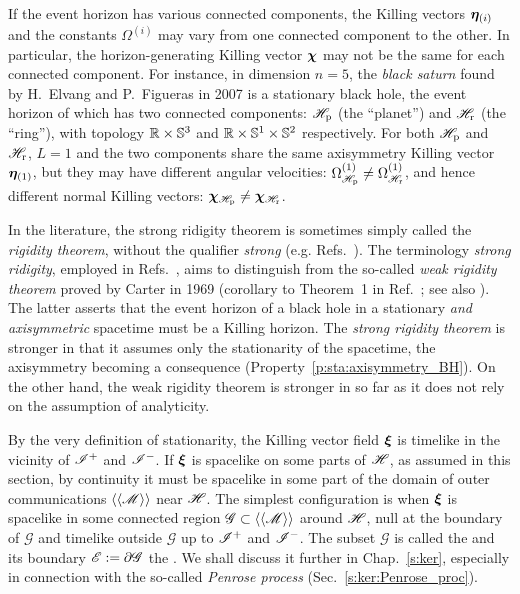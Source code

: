 \begin{remark}
\label{r:sta:dep_eta_Omega}
If the event horizon has various connected components, the Killing vectors
$\bm{\eta}_{(i)}$ and the constants $\Omega^{(i)}$ may vary from one connected
component to the other. In particular, the horizon-generating Killing vector $\bm{\chi}$
may not be the same for each connected component. For instance,
in dimension $n=5$, the \emph{black saturn}
found by H.~Elvang and P.~Figueras in 2007 \cite{ElvanF07}
is a stationary black hole, the event horizon of which has two connected
components: $\mathscr{H}_{\rm p}$ (the ``planet'') and $\mathscr{H}_{\rm r}$ (the ``ring''),
with topology $\mathbb{R}\times\mathbb{S}^3$ and $\mathbb{R}\times\mathbb{S}^1\times\mathbb{S}^2$ respectively.
For both $\mathscr{H}_{\rm p}$ and $\mathscr{H}_{\rm r}$, $L=1$ and
the two components share the same axisymmetry Killing vector $\bm{\eta}_{(1)}$,
but they may have different angular velocities:
$\Omega^{(1)}_{\mathscr{H}_{\rm p}} \neq \Omega^{(1)}_{\mathscr{H}_{\rm r}}$, and hence
different normal Killing vectors: $\bm{\chi}_{\mathscr{H}_{\rm p}} \neq \bm{\chi}_{\mathscr{H}_{\rm r}}$.
\end{remark}

In the literature, the strong ridigity theorem is sometimes simply called
the \emph{rigidity theorem}, without the qualifier \emph{strong}
(e.g. Refs.~\cite{Choqu09,HollaI12}).
The terminology \emph{strong ridigity}, employed in Refs.~\cite{Carte99,ChrusLH12,Heusl96},
aims to distinguish from the so-called
\emph{weak rigidity theorem}
proved by Carter in 1969 (corollary to Theorem~1 in Ref.~\cite{Carte69}; see also \cite{Carte72}). The latter asserts that the event horizon of a black hole in a stationary \emph{and axisymmetric}
spacetime must be a Killing horizon. The \emph{strong rigidity theorem} is
stronger in that it assumes only the stationarity of the spacetime, the axisymmetry
becoming a consequence (Property~\ref{p:sta:axisymmetry_BH}). On the other hand,
the weak rigidity theorem is stronger in so far as it does not rely on the
assumption of analyticity.

By the very definition of stationarity, the Killing vector field $\bm{\xi}$ is
timelike in the vicinity of $\mathscr{I}^+$ and $\mathscr{I}^-$. If $\bm{\xi}$ is spacelike
on some parts of $\mathscr{H}$, as assumed in this section, by continuity it must be spacelike
in some part of the domain of outer communications $\langle\langle \mathscr{M}\rangle\rangle$
near $\mathscr{H}$. The simplest configuration is when
$\bm{\xi}$ is spacelike in some connected region $\mathscr{G}\subset \langle\langle \mathscr{M}\rangle\rangle$
around $\mathscr{H}$, null at the boundary of $\mathscr{G}$ and timelike outside $\mathscr{G}$
up to $\mathscr{I}^+$ and $\mathscr{I}^-$. The subset $\mathscr{G}$ is
called the  and its boundary $\mathscr{E}:=\partial\mathscr{G}$
the . We shall discuss it further in Chap.~\ref{s:ker},
especially in connection with the so-called \emph{Penrose process}
(Sec.~\ref{s:ker:Penrose_proc}).

